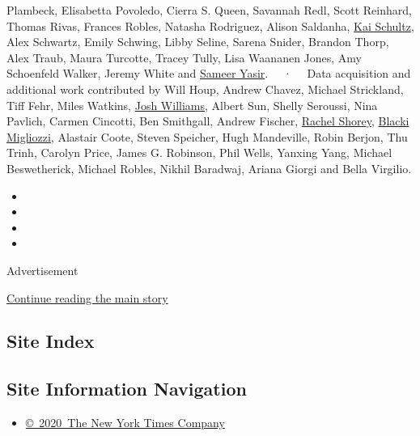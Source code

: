 Plambeck, Elisabetta Povoledo, Cierra S. Queen, Savannah Redl, Scott
Reinhard, Thomas Rivas, Frances Robles, Natasha Rodriguez, Alison
Saldanha, \href{https://www.nytimes3xbfgragh.onion/by/kai-schultz}{Kai
Schultz}, Alex Schwartz, Emily Schwing, Libby Seline, Sarena Snider,
Brandon Thorp, Alex Traub, Maura Turcotte, Tracey Tully, Lisa Waananen
Jones, Amy Schoenfeld Walker, Jeremy White and
\href{https://www.nytimes3xbfgragh.onion/by/sameer-yasir}{Sameer Yasir}.
~~·~~ Data acquisition and additional work contributed by Will Houp,
Andrew Chavez, Michael Strickland, Tiff Fehr, Miles Watkins,
\href{https://www.nytimes3xbfgragh.onion/by/josh-williams}{Josh
Williams}, Albert Sun, Shelly Seroussi, Nina Pavlich, Carmen Cincotti,
Ben Smithgall, Andrew Fischer,
\href{https://www.nytimes3xbfgragh.onion/by/rachel-shorey}{Rachel
Shorey},
\href{https://www.nytimes3xbfgragh.onion/by/blacki-migliozzi}{Blacki
Migliozzi}, Alastair Coote, Steven Speicher, Hugh Mandeville, Robin
Berjon, Thu Trinh, Carolyn Price, James G. Robinson, Phil Wells, Yanxing
Yang, Michael Beswetherick, Michael Robles, Nikhil Baradwaj, Ariana
Giorgi and Bella Virgilio.

\begin{itemize}
\item
\item
\item
\item
\end{itemize}

Advertisement

\protect\hyperlink{after-bottom}{Continue reading the main story}

\hypertarget{site-index}{%
\subsection{Site Index}\label{site-index}}

\hypertarget{site-information-navigation}{%
\subsection{Site Information
Navigation}\label{site-information-navigation}}

\begin{itemize}
\tightlist
\item
  \href{https://help.nytimes3xbfgragh.onion/hc/en-us/articles/115014792127-Copyright-notice}{©~2020~The
  New York Times Company}
\end{itemize}

